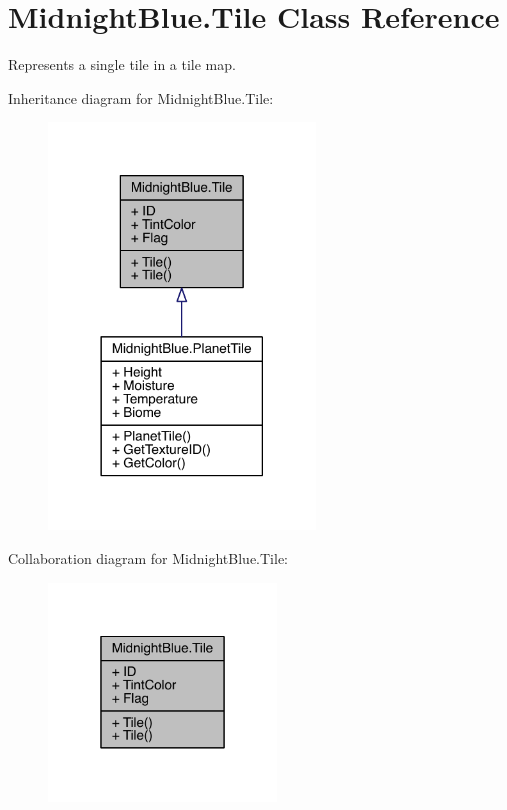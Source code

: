 \hypertarget{class_midnight_blue_1_1_tile}{}\section{Midnight\+Blue.\+Tile Class Reference}
\label{class_midnight_blue_1_1_tile}


Represents a single tile in a tile map.  




Inheritance diagram for Midnight\+Blue.\+Tile\+:
\nopagebreak
\begin{figure}[H]
\begin{center}
\leavevmode
\includegraphics[width=201pt]{class_midnight_blue_1_1_tile__inherit__graph}
\end{center}
\end{figure}


Collaboration diagram for Midnight\+Blue.\+Tile\+:
\nopagebreak
\begin{figure}[H]
\begin{center}
\leavevmode
\includegraphics[width=172pt]{class_midnight_blue_1_1_tile__coll__graph}
\end{center}
\end{figure}
